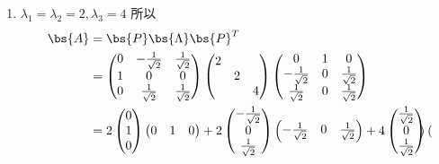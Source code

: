 \documentclass[12pt, a4paper, oneside, UTF8]{ctexbook}
\begin{document}
\begin{solution}
    \begin{enumerate}[label=(\arabic*)]
        \item $\lambda_1=\lambda_2=2,\lambda_3=4$
        所以
        \begin{align*}
            \bs{A}&=\bs{P}\bs{\Lambda}\bs{P}^T\\
            &=\begin{pmatrix}
                0 & -\frac{1}{\sqrt{2}} &\frac{1}{\sqrt{2}} \\
                1 & 0& 0\\
                0 & \frac{1}{\sqrt{2}} &\frac{1}{\sqrt{2}}
            \end{pmatrix}
            \begin{pmatrix}
                2 & & \\
                & 2& \\
                & & 4
            \end{pmatrix}
            \begin{pmatrix}
                0 &1&0 \\
                -\frac{1}{\sqrt{2}} & 0& \frac{1}{\sqrt{2}}\\
                \frac{1}{\sqrt{2}} & 0& \frac{1}{\sqrt{2}}
            \end{pmatrix}\\
            &=2\begin{pmatrix}
                0 \\
                1\\
                0
            \end{pmatrix}\begin{pmatrix}
                0 & 1&0
            \end{pmatrix}+2\begin{pmatrix}
                -\frac{1}{\sqrt{2}}\\
                0\\
                \frac{1}{\sqrt{2}} 
            \end{pmatrix}\begin{pmatrix}
                -\frac{1}{\sqrt{2}} & 0& \frac{1}{\sqrt{2}} 
            \end{pmatrix}+4\begin{pmatrix}
                \frac{1}{\sqrt{2}} \\
                0\\
                \frac{1}{\sqrt{2}} 
            \end{pmatrix}\begin{pmatrix}

\end{pmatrix}
\end{align*}
\end{enumerate}
\end{solution}
\end{document}
